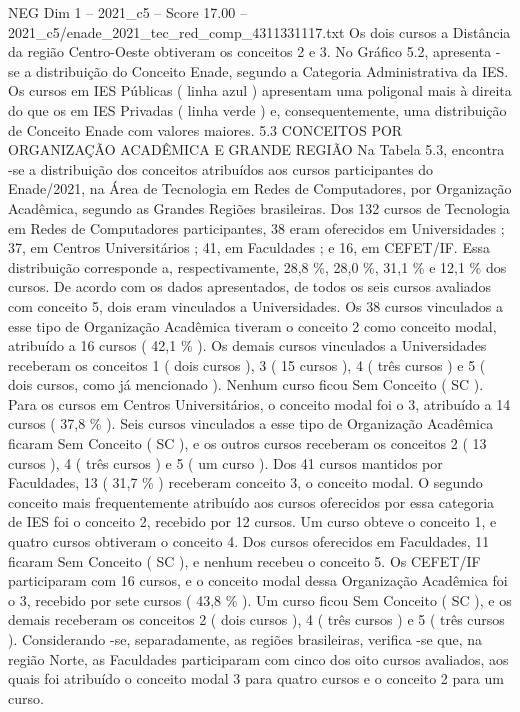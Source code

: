 \begin{textsample}{NEG Dim 1 – 2021\_c5 – Score 17.00 – 2021\_c5/enade\_2021\_tec\_red\_comp\_4311331117.txt}
Os dois cursos a Distância da região Centro-Oeste obtiveram os conceitos 2 e 3.
No Gráfico 5.2, apresenta -se a distribuição do Conceito Enade, segundo a Categoria Administrativa da IES.
Os cursos em IES Públicas ( linha azul ) apresentam uma poligonal mais à direita do que os em IES Privadas ( linha verde ) e, consequentemente, uma distribuição de Conceito Enade com valores maiores. 5.3 CONCEITOS POR ORGANIZAÇÃO ACADÊMICA E GRANDE REGIÃO Na Tabela 5.3, encontra -se a distribuição dos conceitos atribuídos aos cursos participantes do Enade/2021, na Área de Tecnologia em Redes de Computadores, por Organização Acadêmica, segundo as Grandes Regiões brasileiras.
Dos 132 cursos de Tecnologia em Redes de Computadores participantes, 38 eram oferecidos em Universidades ; 37, em Centros Universitários ; 41, em Faculdades ; e 16, em CEFET/IF.
Essa distribuição corresponde a, respectivamente, 28,8 \%, 28,0 \%, 31,1 \% e 12,1 \% dos cursos.
De acordo com os dados apresentados, de todos os seis cursos avaliados com conceito 5, dois eram vinculados a Universidades.
Os 38 cursos vinculados a esse tipo de Organização Acadêmica tiveram o conceito 2 como conceito modal, atribuído a 16 cursos ( 42,1 \% ).
Os demais cursos vinculados a Universidades receberam os conceitos 1 ( dois cursos ), 3 ( 15 cursos ), 4 ( três cursos ) e 5 ( dois cursos, como já mencionado ).
Nenhum curso ficou Sem Conceito ( SC ).
Para os cursos em Centros Universitários, o conceito modal foi o 3, atribuído a 14 cursos ( 37,8 \% ).
Seis cursos vinculados a esse tipo de Organização Acadêmica ficaram Sem Conceito ( SC ), e os outros cursos receberam os conceitos 2 ( 13 cursos ), 4 ( três cursos ) e 5 ( um curso ).
Dos 41 cursos mantidos por Faculdades, 13 ( 31,7 \% ) receberam conceito 3, o conceito modal.
O segundo conceito mais frequentemente atribuído aos cursos oferecidos por essa categoria de IES foi o conceito 2, recebido por 12 cursos.
Um curso obteve o conceito 1, e quatro cursos obtiveram o conceito 4.
Dos cursos oferecidos em Faculdades, 11 ficaram Sem Conceito ( SC ), e nenhum recebeu o conceito 5.
Os CEFET/IF participaram com 16 cursos, e o conceito modal dessa Organização Acadêmica foi o 3, recebido por sete cursos ( 43,8 \% ).
Um curso ficou Sem Conceito ( SC ), e os demais receberam os conceitos 2 ( dois cursos ), 4 ( três cursos ) e 5 ( três cursos ).
Considerando -se, separadamente, as regiões brasileiras, verifica -se que, na região Norte, as Faculdades participaram com cinco dos oito cursos avaliados, aos quais foi atribuído o conceito modal 3 para quatro cursos e o conceito 2 para um curso.

\end{textsample}
